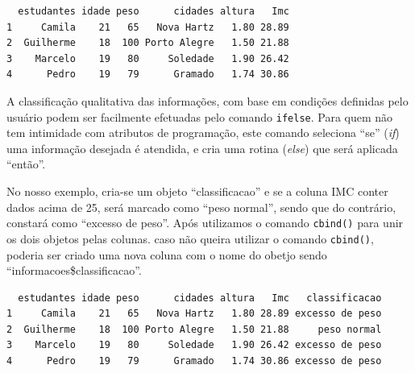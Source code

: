 \documentclass[12pt,brazil,oneside]{book}
\newenvironment{Shaded}{\begin{snugshade}}{\end{snugshade}}
\newcommand{\CommentTok}[1]{\textcolor[rgb]{0.56,0.35,0.01}{\textit{#1}}}
\newcommand{\DecValTok}[1]{\textcolor[rgb]{0.00,0.00,0.81}{#1}}
\newcommand{\KeywordTok}[1]{\textcolor[rgb]{0.13,0.29,0.53}{\textbf{#1}}}
\newcommand{\NormalTok}[1]{#1}
\newcommand{\OperatorTok}[1]{\textcolor[rgb]{0.81,0.36,0.00}{\textbf{#1}}}
\newcommand{\StringTok}[1]{\textcolor[rgb]{0.31,0.60,0.02}{#1}}
\begin{document}
\begin{Shaded}
\end{Shaded}

\begin{verbatim}
  estudantes idade peso      cidades altura   Imc
1     Camila    21   65   Nova Hartz   1.80 28.89
2  Guilherme    18  100 Porto Alegre   1.50 21.88
3    Marcelo    19   80     Soledade   1.90 26.42
4      Pedro    19   79      Gramado   1.74 30.86
\end{verbatim}

A classificação qualitativa das informações, com base em condições
definidas pelo usuário podem ser facilmente efetuadas pelo comando
\texttt{ifelse}. Para quem não tem intimidade com atributos de
programação, este comando seleciona ``se'' (\emph{if}) uma informação
desejada é atendida, e cria uma rotina (\emph{else}) que será aplicada
``então''.

No nosso exemplo, cria-se um objeto ``classificacao'' e se a coluna IMC
conter dados acima de 25, será marcado como ``peso normal'', sendo que
do contrário, constará como ``excesso de peso''. Após utilizamos o
comando \texttt{cbind()} para unir os dois objetos pelas colunas. caso
não queira utilizar o comando \texttt{cbind()}, poderia ser criado uma
nova coluna com o nome do obetjo sendo ``informacoes\$classificacao''.

\begin{Shaded}
\end{Shaded}

\begin{verbatim}
  estudantes idade peso      cidades altura   Imc   classificacao
1     Camila    21   65   Nova Hartz   1.80 28.89 excesso de peso
2  Guilherme    18  100 Porto Alegre   1.50 21.88     peso normal
3    Marcelo    19   80     Soledade   1.90 26.42 excesso de peso
4      Pedro    19   79      Gramado   1.74 30.86 excesso de peso
\end{verbatim}
\end{document}
